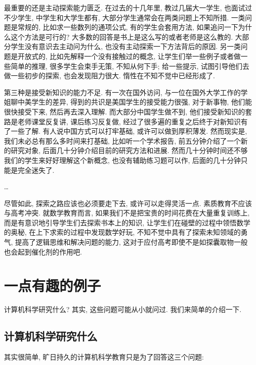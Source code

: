 \begin{pas}
        
        
        最重要的还是主动探索能力匮乏. 在过去的十几年里, 教过几届大一学生, 也面试过不少学生, 中学生和大学生都有, 大部分学生通常会在两类问题上不知所措. 一类问题是常规的, 比如求一些数列的通项公式, 有的学生会套用方法, 如果追问一下为什么这个方法是可行的? 大多数的回答是书上是这么写的或者老师是这么教的. 大部分学生没有意识去主动问为什么, 也没有主动探索一下方法背后的原因. 另一类问题是开放式的, 比如先解释一个没有接触过的概念, 让学生们举一些例子或者做一些简单的推理, 很多学生会束手无策, 不知从何下手; 给一些提示, 试图引导他们去做一些初步的探索, 也会发现阻力很大. 惰性在不知不觉中已经形成了.
        
        
        
        第三种是接受新知识的能力不足. 有一次在国外访问, 与一位在国外大学工作的学姐聊中美学生的差异, 得到的共识是美国学生的接受能力很强, 对于新事物, 他们能很快接受下来, 然后再去深入理解. 而大部分中国学生做不到, 他们接受新知识的套路是老师课堂反复讲, 课后练习反复做, 经过了很多遍的重复之后终于对新知识有了一些了解. 有人说中国方式可以打牢基础, 或许可以做到厚积薄发. 然而现实是, 我们未必总有那么多时间来打基础, 比如听一个学术报告, 前五分钟介绍了一个新的研究对象, 后面几十分钟介绍目前的研究方法和进展. 然而几十分钟时间还不够我们的学生来好好理解这个新概念, 也没有辅助练习题可以作, 后面的几十分钟只能是完全迷失了.

        \dots

        尽管如此, 探索之路应该也必须要走下去, 或许可以走得灵活一点. 素质教育不应该与高考冲突. 就数学教育而言, 如果我们不是把宝贵的时间花费在大量重复训练上, 而是有意识地引导学生们去探索书本上的知识, 让学生们在碰壁的过程中领悟数学的奥秘, 在上下求索的过程中发现数学好玩, 不知不觉中具有了探索未知领域的勇气, 提高了逻辑思维和解决问题的能力, 这对于应付高考即使不是如探囊取物一般也会起到催化剂的作用吧.

    \end{pas}

    \section{一点有趣的例子}

    计算机科学研究什么? 其实, 这些问题可能从小就问过. 我们来简单的介绍一下. 

   \subsection{计算机科学研究什么}

   其实很简单, 旷日持久的计算机科学教育只是为了回答这三个问题: 

